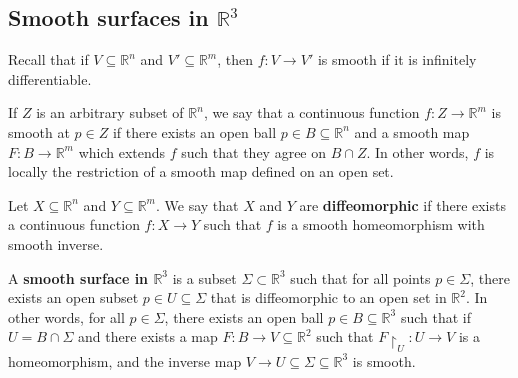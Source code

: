 \documentclass[a4paper]{article}
\begin{document}
\subsection{Smooth surfaces in \( \mathbb R^3 \)}
Recall that if \( V \subseteq \mathbb R^n \) and \( V' \subseteq \mathbb R^m \), then \( f \colon V \to V' \) is smooth if it is infinitely differentiable.
\begin{definition}
	If \( Z \) is an arbitrary subset of \( \mathbb R^n \), we say that a continuous function \( f \colon Z \to \mathbb R^m \) is smooth at \( p \in Z \) if there exists an open ball \( p \in B \subseteq \mathbb R^n \) and a smooth map \( F \colon B \to \mathbb R^m \) which extends \( f \) such that they agree on \( B \cap Z \).
	In other words, \( f \) is locally the restriction of a smooth map defined on an open set.
\end{definition}
\begin{definition}
	Let \( X \subseteq \mathbb R^n \) and \( Y \subseteq \mathbb R^m \).
	We say that \( X \) and \( Y \) are \textbf{diffeomorphic} if there exists a continuous function \( f \colon X \to Y \) such that \( f \) is a smooth homeomorphism with smooth inverse.
\end{definition}

\begin{definition}
	A \textbf{smooth surface in \( \mathbb R^3 \)} is a subset \(\Sigma \subset \mathbb R^3 \) such that for all points \( p \in \Sigma \), there exists an open subset \( p \in U \subseteq \Sigma \) that is diffeomorphic to an open set in \( \mathbb R^2 \).
	In other words, for all \( p \in \Sigma \), there exists an open ball \( p \in B \subseteq \mathbb R^3 \) such that if \( U = B \cap \Sigma \) and there exists a map \( F \colon B \to V \subseteq \mathbb R^2 \) such that \( {F}\restriction_U \colon U \to V \) is a homeomorphism, and the inverse map \( V \to U \subseteq \Sigma \subseteq \mathbb R^3 \) is smooth.
\end{definition}
\end{document}
